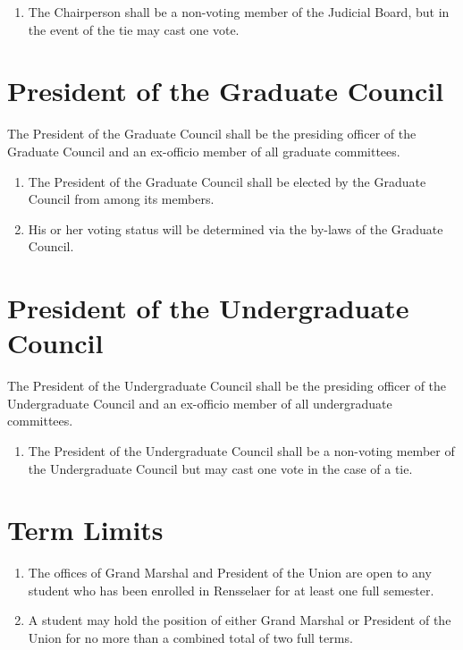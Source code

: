 \begin{enumerate}
\item The Chairperson shall be a non-voting member of the Judicial Board, but in the event of the tie may cast one vote.
\end{enumerate}

\section{President of the Graduate Council}
The President of the Graduate Council shall be the presiding officer of the Graduate Council and an ex-officio member of all graduate committees.

\begin{enumerate}
\item The President of the Graduate Council shall be elected by the Graduate Council from among its members.
\item His or her voting status will be determined via the by-laws of the Graduate Council. 
\end{enumerate}

\section{President of the Undergraduate Council}
The President of the Undergraduate Council shall be the presiding officer of the Undergraduate Council and an ex-officio member of all undergraduate committees.

\begin{enumerate}
\item The President of the Undergraduate Council shall be a non-voting member of the
Undergraduate Council but may cast one vote in the case of a tie.
\end{enumerate}

\section{Term Limits}
\begin{enumerate}
\item The offices of Grand Marshal and President of the Union are open to any student who has been
enrolled in Rensselaer for at least one full semester.
\item A student may hold the position of either Grand Marshal or President of the Union for no more than a combined total of two full terms.
\end{enumerate}